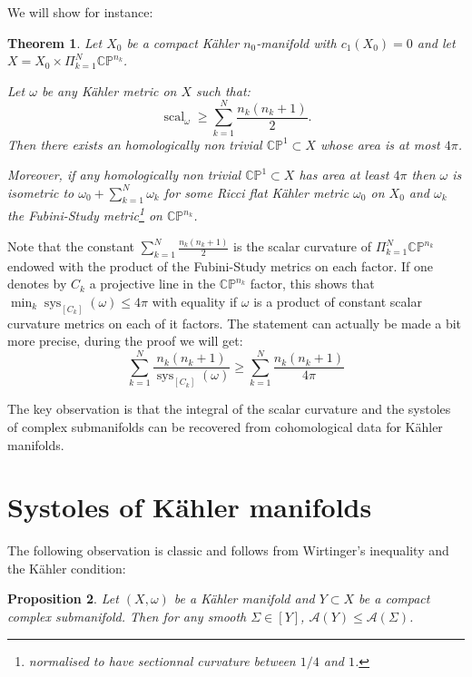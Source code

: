 \documentclass{amsart}
\newtheorem{theorem}{Theorem}[section]
\newtheorem{proposition}[theorem]{Proposition}
\numberwithin{equation}{section}
\theoremstyle{definition}
\DeclareMathOperator{\scal}{scal}
\DeclareMathOperator{\sys}{sys}
\begin{document}
We will show for instance:

\begin{theorem}\label{thm_prod_proj}
Let $X_0$ be a compact K\"ahler $n_0$-manifold
with $c_1(X_0)=0$ %
and let $X=X_0\times\Pi_{k=1}^N\mathbb{CP}^{n_k}$. %

Let $\omega$ be any K\"ahler metric on $X$ such that:
\[\scal_\omega\geq \sum_{k=1}^N \frac{n_k(n_k+1)}{2}.\]
Then there exists an homologically non trivial
$\mathbb{CP}^1\subset X$ whose area is at most $4\pi$.

Moreover, if any homologically non trivial $\mathbb{CP}^1\subset X$ has area at least $4\pi$ then $\omega$ is isometric to $\omega_0+\sum_{k=1}^N\omega_k$ for some Ricci flat K\"ahler metric $\omega_0$ on $X_0$ and $\omega_k$ the Fubini-Study metric\footnote{normalised to have sectionnal curvature between $1/4$ and $1$.} on $\mathbb{CP}^{n_k}$.
\end{theorem}

Note that the constant $\sum_{k=1}^N \frac{n_k(n_k+1)}{2}$ is the scalar curvature of $\Pi_{k=1}^N\mathbb{CP}^{n_k}$ endowed with the product of the Fubini-Study metrics on each factor.
If one denotes by $C_k$ a projective line in the $\mathbb{CP}^{n_k}$ factor, this shows that $\min_k\sys_{[C_k]}(\omega)\leq 4\pi$ with equality if $\omega$ is a product of constant scalar curvature metrics on each of it factors. The statement can actually be made a bit more precise, during the proof we will get:
\[\sum_{k=1}^N\frac{n_k(n_k+1)}{\sys_{[C_k]}(\omega)}\geq \sum_{k=1}^N \frac{n_k(n_k+1)}{4\pi}\]

The key observation is that the integral of the scalar curvature and the systoles of complex submanifolds can be recovered from cohomological data for K\"ahler manifolds.


\section{Systoles of K\"ahler manifolds}

The following observation is classic and follows from Wirtinger's inequality and the K\"ahler condition:

\begin{proposition}
Let $(X,\omega)$ be a K\"ahler manifold and $Y\subset X$ be a compact complex submanifold. Then for any smooth $\Sigma\in [Y]$, $\mathcal{A}(Y)\leq\mathcal{A}(\Sigma)$.
\end{proposition}
\end{document}
